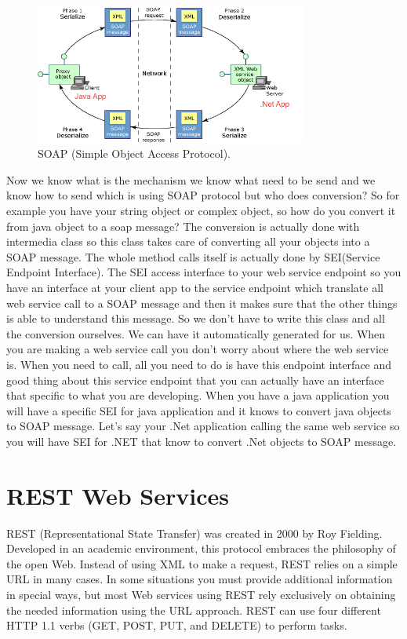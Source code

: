 \begin{figure}[!htb]
  \centering
  \includegraphics[width=0.8\textwidth]{Figures/soap.png}
  \caption[SOAP (Simple Object Access Protocol).]{SOAP (Simple Object Access Protocol).}
  \label{fig:wsdl}
\end{figure}

Now we know what is the mechanism we know what need to be send and we know how to send which is using SOAP protocol
but who does conversion? So for example you have your string object or complex object, so how do you convert it from java
object to a soap message? The conversion is actually done with intermedia class so this class takes care of converting all
your objects into a SOAP message. The whole method calls itself is actually done by SEI(Service Endpoint Interface)\citep{thesis:state4}. The SEI access interface to your
web service endpoint so you have an interface at your client app to the service endpoint which translate all web service
call to a SOAP message and then it makes sure that the other things is able to understand this message. So we don’t have to
write this class and all the conversion ourselves. We can have it automatically generated for us. When you are making a web
service call you don’t worry about where the web service is. When you need to call, all you need to do is have this endpoint
interface and good thing about this service endpoint that you can actually have an interface that specific to what you are
developing. When you have a java application you will have a specific SEI for java application and it knows to convert java
objects to SOAP message. Let’s say your .Net application calling the same web service so you will have SEI for .NET that know
to convert .Net objects to SOAP message.\\

\section{REST Web Services}
\label{section:rest}
REST (Representational State Transfer) was created in 2000 by Roy Fielding\citep{rest:restinpractice}. Developed in an academic
environment, this protocol embraces the philosophy of the open Web. Instead of using XML to make a request, REST relies on a simple URL in many cases. In some situations you must provide
additional information in special ways, but most Web services using REST rely exclusively on obtaining the needed
information using the URL approach. REST can use four different HTTP 1.1 verbs (GET, POST, PUT, and DELETE) to
perform tasks.\\

